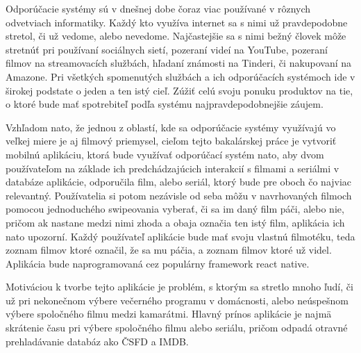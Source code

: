 
Odporúčacie systémy sú v dnešnej dobe čoraz viac používané v rôznych odvetviach informatiky. Každý kto využíva internet sa s nimi už pravdepodobne stretol, či už vedome, alebo nevedome. Najčastejšie sa s nimi bežný človek môže stretnúť pri používaní sociálnych sietí, pozeraní videí na YouTube, pozeraní filmov na streamovacích službách, hľadaní známosti na Tinderi, či nakupovaní na Amazone. Pri všetkých spomenutých službách a ich odporúčacích systémoch ide v širokej podstate o jeden a ten istý cieľ. Zúžiť celú svoju ponuku produktov na tie, o ktoré bude mať spotrebiteľ podľa systému najpravdepodobnejšie záujem.\newline

\noindent Vzhľadom nato, že jednou z oblastí, kde sa odporúčacie systémy využívajú vo veľkej miere je aj filmový priemysel, cieľom tejto bakalárskej práce je vytvoriť mobilnú aplikáciu, ktorá bude využívať odporúčací systém nato, aby dvom používateľom na základe ich predchádzajúcich interakcií s filmami a seriálmi v databáze aplikácie, odporučila film, alebo seriál, ktorý bude pre oboch čo najviac relevantný. Používatelia si potom nezávisle od seba môžu v navrhovaných filmoch pomocou jednoduchého swipeovania vyberať, či sa im daný film páči, alebo nie, pričom ak nastane medzi nimi zhoda a obaja označia ten istý film, aplikácia ich nato upozorní. Každý používateľ aplikácie bude mať svoju vlastnú filmotéku, teda zoznam filmov ktoré označil, že sa mu páčia, a zoznam filmov ktoré už videl. Aplikácia bude naprogramovaná cez populárny framework react native.\newline

\noindent Motiváciou k tvorbe tejto aplikácie je problém, s ktorým sa stretlo mnoho ľudí, či už pri nekonečnom výbere večerného programu v domácnosti, alebo neúspešnom výbere spoločného filmu medzi kamarátmi. Hlavný prínos aplikácie je najmä skrátenie času pri výbere spoločného filmu alebo seriálu, pričom odpadá otravné prehladávanie databáz ako ČSFD a IMDB.\newline
